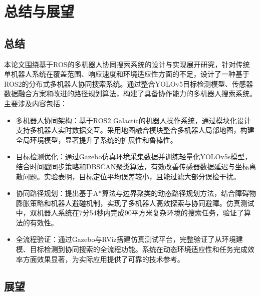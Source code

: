 \chapter{总结与展望}
\section{总结}
本论文围绕基于ROS的多机器人协同搜索系统的设计与实现展开研究，针对传统单机器人系统在覆盖范围、响应速度和环境适应性方面的不足，设计了一种基于ROS2的分布式多机器人协同搜索系统。通过整合YOLOv5目标检测模型、传感器数据融合方案和改进的路径规划算法，构建了具备协作能力的多机器人搜索系统。主要涉及内容包括：
\begin{itemize}

    \item 多机器人协同架构：基于ROS2 Galactic的机器人操作系统，通过模块化设计支持多机器人实时数据交互。采用地图融合模块整合多机器人局部地图，构建全局环境模型，显著提升了系统的扩展性和鲁棒性。

    \item 目标检测优化：通过Gazebo仿真环境采集数据并训练轻量化YOLOv5s模型，结合时间戳同步策略和DBSCAN聚类算法，有效改善传感器数据延迟与坐标离散问题。实验表明，目标定位平均误差较小，且能过滤大部分误检干扰。

    \item 协同路径规划：提出基于A*算法与边界聚类的动态路径规划方法，结合障碍物膨胀策略和机器人避碰机制，实现了多机器人高效探索与协同避障。仿真测试中，双机器人系统在7分54秒内完成90平方米复杂环境的搜索任务，验证了算法的有效性。

    \item 全流程验证：通过Gazebo与RViz搭建仿真测试平台，完整验证了从环境建模、目标检测到协同搜索的全流程功能。系统在动态环境适应性和任务完成效率方面效果显著，为实际应用提供了可靠的技术参考。

\end{itemize}
\section{展望}


